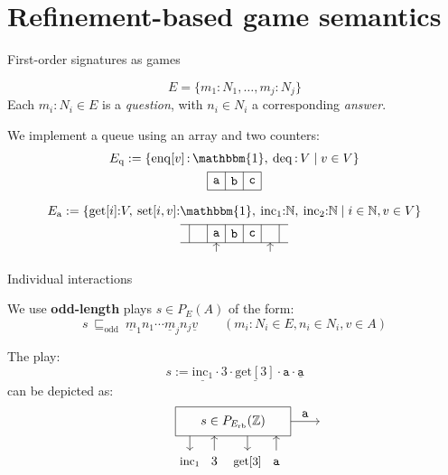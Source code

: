 \documentclass[aspectratio=54]{beamer}
\newcommand{\kw}[1]{\ensuremath{ \mathrm{#1} }}
\newcommand{\deqpic}[3]{%
  \begin{tikzpicture}[scale=0.4]
    \draw (-4,-1) rectangle (4,1);
    \node (x) at (0,0) {$#1$};
    \draw[->] (-3, -1) -- (-3, -2);
    \node[anchor=base] at (-3, -3) {\small $\kw{inc}_1$};
    \draw[<-] (-1.3, -1) -- (-1.3, -2);
    \node[anchor=base] at (-1.3, -3) {$#2$};
    \draw[->] (1, -1) -- (1, -2);
    \node[anchor=base] at (1, -3) {\small $\kw{get}[#2]$};
    \draw[<-] (3, -1) -- (3, -2);
    \node[anchor=base] at (3, -3) {$#3$};
    \draw[->] (4,0) -- node[above] {$#3$} (6,0);
  \end{tikzpicture}%
}
\begin{document}

\section{Refinement-based game semantics} %

\begin{frame}{First-order signatures as games} %
  \begin{definition}[Signature]
  \[
    E = \{ m_1 : N_1, \ldots, m_j : N_j \}
  \]
  Each $m_i : N_i \in E$ is a \emph{question},
  with $n_i \in N_i$ a corresponding \emph{answer}.
  \end{definition}
  \pause
  \begin{example}
    We implement a queue using an array and two counters:
    \begin{gather*}
      E_\kw{q} := \{
        \kw{enq}[v] \mathop{:} \mathbbm{1}, \:
        \kw{deq} \mathop{:} V \mid
        v \in V \}
      \\
      \begin{tikzpicture}[scale=0.5]
        \draw (0,0) grid (3,1);
        \node at (0.5,0.5) {$\mathtt{a}$};
        \node at (1.5,0.5) {$\mathtt{b}$};
        \node at (2.5,0.5) {$\mathtt{c}$};
      \end{tikzpicture}
      \\[1ex]
      E_\kw{a} := \{
        \kw{get}[i] {:} V, \:
        \kw{set}[i,v] {:} \mathbbm{1}, \:
        \kw{inc}_1 {:} \mathbb{N}, \:
        \kw{inc}_2 {:} \mathbb{N}
        \mid i \in \mathbb{N}, v \in V \} \\
      \begin{tikzpicture}[scale=0.5]
        \draw (-0.5,0) grid (5.5,1);
        \node at (1.5,0.5) {$\mathtt{a}$};
        \node at (2.5,0.5) {$\mathtt{b}$};
        \node at (3.5,0.5) {$\mathtt{c}$};
        \draw[->] (1.5,-0.5) -- (1.5,0);
        \draw[->] (4.5,-0.5) -- (4.5,0);
      \end{tikzpicture}
    \end{gather*}
  \end{example}
\end{frame}

\begin{frame}{Individual interactions} %
\begin{definition}[Plays]
We use \textbf{odd-length} plays $s \in P_E(A)$ of the form:
\[
  s \: \sqsubseteq_\kw{odd} \:
    \underline{m}_1 n_1
    \cdots
    \underline{m}_j n_j
    \underline{v}
  \qquad
  (m_i : N_i \in E, n_i \in N_i, v \in A)
\]
\end{definition}
\pause
\begin{example}
  The play:
  \[
    s :=
    \underline{\kw{inc}_1} \cdot 3 \cdot
    \underline{\kw{get}[3]} \cdot \mathtt{a} \cdot
    \underline{\mathtt{a}}
  \]
  can be depicted as:
  \[
    \qquad
    \deqpic{s \in {P}_{E_\kw{rb}}(\mathbb{Z})}{3}{\mathtt{a}}
  \]
\end{example}
\end{frame}
\end{document}
